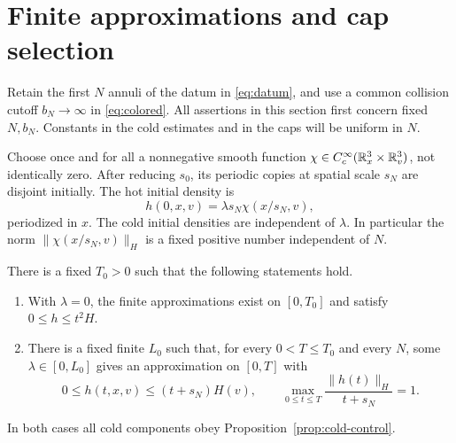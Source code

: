 \section{Finite approximations and cap selection}\label{sec:cap}

Retain the first \(N\) annuli of the datum in \eqref{eq:datum}, and use a
common collision cutoff \(b_N\to\infty\) in \eqref{eq:colored}. All assertions
in this section first concern fixed \(N,b_N\). Constants in the cold
estimates and in the caps will be uniform in \(N\).

Choose once and for all a nonnegative smooth function
\(\chi\in C_c^\infty(\mathbb R^3_x\times\mathbb R^3_v)\), not identically zero.
After reducing \(s_0\), its periodic copies at spatial scale \(s_N\) are
disjoint initially. The hot initial density is
\[
h(0,x,v)=\lambda s_N\chi(x/s_N,v),
\]
periodized in \(x\). The cold initial densities are independent of
\(\lambda\). In particular the norm
\(\|\chi(x/s_N,v)\|_H\) is a fixed positive number independent of \(N\).

\begin{proposition}\label{prop:finite-cap}
There is a fixed \(T_0>0\) such that the following statements hold.
\begin{enumerate}[label=\textup{(\alph*)}]
\item With \(\lambda=0\), the finite approximations exist on \([0,T_0]\)
and satisfy \(0\le h\le t^2H\).
\item There is a fixed finite \(L_0\) such that, for every
\(0<T\le T_0\) and every \(N\), some \(\lambda\in[0,L_0]\) gives an
approximation on \([0,T]\) with
\begin{equation}\label{eq:cap}
0\le h(t,x,v)\le(t+s_N)H(v),\qquad
\max_{0\le t\le T}\frac{\|h(t)\|_H}{t+s_N}=1.
\end{equation}
\end{enumerate}
In both cases all cold components obey Proposition~\ref{prop:cold-control}.
\end{proposition}

